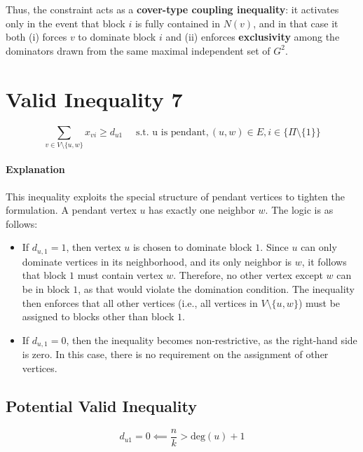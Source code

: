 Thus, the constraint acts as a \textbf{cover-type coupling inequality}: it activates only in the event that block $i$ is fully contained in $N(v)$, and in that case it both (i) forces $v$ to dominate block $i$ and (ii) enforces \textbf{exclusivity} among the dominators drawn from the same maximal independent set of $G^2$.


\section{Valid Inequality 7}  
\begin{equation}
    \sum_{v \in V \setminus \{u,w\}} x_{vi} \geq d_{u1} \quad \text{ s.t. u is pendant}, (u,w) \in E, i \in \{\Pi \setminus \{1\}\}
\end{equation}

\paragraph{Explanation} This inequality exploits the special structure of pendant vertices to tighten the formulation. A pendant vertex $u$ has exactly one neighbor $w$. The logic is as follows:
\begin{itemize}
    \item If $d_{u,1} = 1$, then vertex $u$ is chosen to dominate block $1$. Since $u$ can only dominate vertices in its neighborhood, and its only neighbor is $w$, it follows that block $1$ must contain vertex $w$. Therefore, no other vertex except $w$ can be in block $1$, as that would violate the domination condition. The inequality then enforces that all other vertices (i.e., all vertices in $V \setminus \{u,w\}$) must be assigned to blocks other than block $1$.
    
    \item If $d_{u,1} = 0$, then the inequality becomes non-restrictive, as the right-hand side is zero. In this case, there is no requirement on the assignment of other vertices.
\end{itemize}

\subsection{Potential Valid Inequality}
\begin{equation}
    d_{u1} = 0 \impliedby \frac{n}{k} > \text{deg}(u) + 1
\end{equation}

